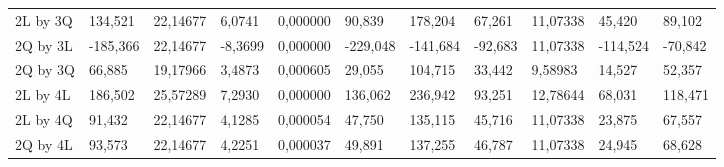 \begin{table}[H]
{\begin{tabular}{lllllllllll}
\rowcolor[HTML]{FFFFFF} 
{\color[HTML]{000000} 2L by 3Q}       & {\color[HTML]{FF0000} 134,521}  & {\color[HTML]{FF0000} 22,14677} & {\color[HTML]{FF0000} 6,0741}   & {\color[HTML]{FF0000} 0,000000} & {\color[HTML]{FF0000} 90,839}         & {\color[HTML]{FF0000} 178,204}        & {\color[HTML]{FF0000} 67,261}   & {\color[HTML]{FF0000} 11,07338}      & {\color[HTML]{FF0000} 45,420}         & {\color[HTML]{FF0000} 89,102}         \\
\rowcolor[HTML]{FFFFFF} 
{\color[HTML]{000000} 2Q by 3L}       & {\color[HTML]{FF0000} -185,366} & {\color[HTML]{FF0000} 22,14677} & {\color[HTML]{FF0000} -8,3699}  & {\color[HTML]{FF0000} 0,000000} & {\color[HTML]{FF0000} -229,048}       & {\color[HTML]{FF0000} -141,684}       & {\color[HTML]{FF0000} -92,683}  & {\color[HTML]{FF0000} 11,07338}      & {\color[HTML]{FF0000} -114,524}       & {\color[HTML]{FF0000} -70,842}        \\
\rowcolor[HTML]{FFFFFF} 
{\color[HTML]{000000} 2Q by 3Q}       & {\color[HTML]{FF0000} 66,885}   & {\color[HTML]{FF0000} 19,17966} & {\color[HTML]{FF0000} 3,4873}   & {\color[HTML]{FF0000} 0,000605} & {\color[HTML]{FF0000} 29,055}         & {\color[HTML]{FF0000} 104,715}        & {\color[HTML]{FF0000} 33,442}   & {\color[HTML]{FF0000} 9,58983}       & {\color[HTML]{FF0000} 14,527}         & {\color[HTML]{FF0000} 52,357}         \\
\rowcolor[HTML]{FFFFFF} 
{\color[HTML]{000000} 2L by 4L}       & {\color[HTML]{FF0000} 186,502}  & {\color[HTML]{FF0000} 25,57289} & {\color[HTML]{FF0000} 7,2930}   & {\color[HTML]{FF0000} 0,000000} & {\color[HTML]{FF0000} 136,062}        & {\color[HTML]{FF0000} 236,942}        & {\color[HTML]{FF0000} 93,251}   & {\color[HTML]{FF0000} 12,78644}      & {\color[HTML]{FF0000} 68,031}         & {\color[HTML]{FF0000} 118,471}        \\
\rowcolor[HTML]{FFFFFF} 
{\color[HTML]{000000} 2L by 4Q}       & {\color[HTML]{FF0000} 91,432}   & {\color[HTML]{FF0000} 22,14677} & {\color[HTML]{FF0000} 4,1285}   & {\color[HTML]{FF0000} 0,000054} & {\color[HTML]{FF0000} 47,750}         & {\color[HTML]{FF0000} 135,115}        & {\color[HTML]{FF0000} 45,716}   & {\color[HTML]{FF0000} 11,07338}      & {\color[HTML]{FF0000} 23,875}         & {\color[HTML]{FF0000} 67,557}         \\
\rowcolor[HTML]{FFFFFF} 
2Q by 4L                              & {\color[HTML]{FF0000} 93,573}   & {\color[HTML]{FF0000} 22,14677} & {\color[HTML]{FF0000} 4,2251}   & {\color[HTML]{FF0000} 0,000037} & {\color[HTML]{FF0000} 49,891}         & {\color[HTML]{FF0000} 137,255}        & {\color[HTML]{FF0000} 46,787}   & {\color[HTML]{FF0000} 11,07338}      & {\color[HTML]{FF0000} 24,945}         & {\color[HTML]{FF0000} 68,628}         \\

\end{tabular}}
\end{table}
